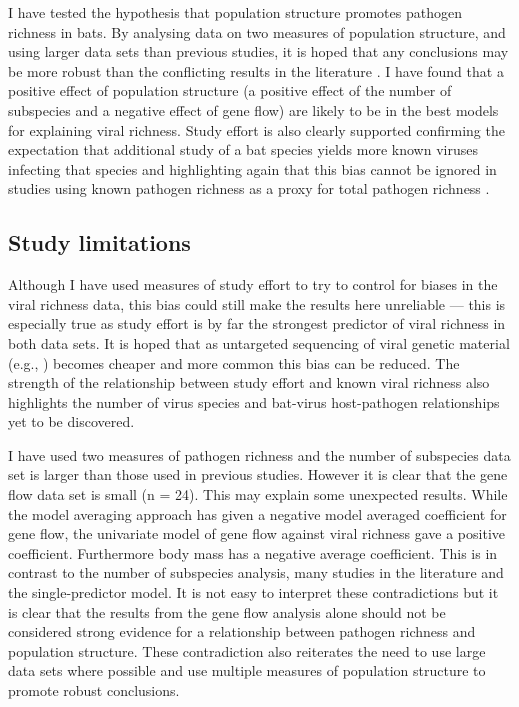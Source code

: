 

I have tested the hypothesis that population structure promotes pathogen richness in bats.
By analysing data on two measures of population structure, and using larger data sets than previous studies, it is hoped that any conclusions may be more robust than the conflicting results in the literature \cite{gay2014parasite, turmelle2009correlates, maganga2014bat}.
I have found that a positive effect of population structure (a positive effect of the number of subspecies and a negative effect of gene flow) are likely to be in the best models for explaining viral richness.
Study effort is also clearly supported confirming the expectation that additional study of a bat species yields more known viruses infecting that species and highlighting again that this bias cannot be ignored in studies using known pathogen richness as a proxy for total pathogen richness \cite{}.


\subsection{Study limitations}

Although I have used measures of study effort to try to control for biases in the viral richness data, this bias could still make the results here unreliable --- this is especially true as study effort is by far the strongest predictor of viral richness in both data sets.
It is hoped that as untargeted sequencing of viral genetic material (e.g., \textcite{anthony2013strategy}) becomes cheaper and more common this bias can be reduced.
The strength of the relationship between study effort and known viral richness also highlights the number of virus species and bat-virus host-pathogen relationships yet to be discovered.

I have used two measures of pathogen richness and the number of subspecies data set is larger than those used in previous studies.
However it is clear that the gene flow data set is small (n = 24).
This may explain some unexpected results.
While the model averaging approach has given a negative model averaged coefficient for gene flow, the univariate model of gene flow against viral richness gave a positive coefficient.
Furthermore body mass has a negative average coefficient.
This is in contrast to the number of subspecies analysis, many studies in the literature \cite{kamiya2014determines, turmelle2009correlates, gay2014parasite, maganga2014bat} and the single-predictor model.
It is not easy to interpret these contradictions but it is clear that the results from the gene flow analysis alone should not be considered strong evidence for a relationship between pathogen richness and population structure.
These contradiction also reiterates the need to use large data sets where possible and use multiple measures of population structure to promote robust conclusions.

